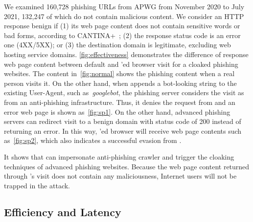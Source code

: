 We examined 160,728 phishing URLs from APWG from November 2020 to July 2021,
132,247 of which do not contain malicious content.
We consider an HTTP response benign if (1) its web page content does not contain sensitive words or bad forms, according to CANTINA+~\cite{xiang2011cantina+};
(2) the response status code is an error one (4XX/5XX);
or (3) the destination domain is legitimate, excluding web hosting service domains.
\autoref{fig:effectiveness} demonstrates the difference of response web page content between default and \spartacus'ed browser visit for a cloaked phishing websites.
The content in~\autoref{fig:normal} shows the phishing content when a real person visits it.
On the other hand, when \spartacus appends a bot-looking string to the existing User-Agent, such as~\emph{googlebot}, the phishing server considers the visit as from an anti-phishing infrastructure.
Thus, it denies the request from \spartacus and an error web page is shown as~\autoref{fig:sp1}.
On the other hand, advanced phishing servers can redirect visit to a benign domain with status code of 200 instead of returning an error.
In this way, \spartacus'ed browser will receive web page contents such as~\autoref{fig:sp2},
which also indicates a successful evasion 
from \spartacus.

It shows that \spartacus can impersonate anti-phishing crawler and trigger the cloaking techniques of advanced phishing websites.
Because the web page content returned through \spartacus's visit does not contain any maliciousness, Internet users will not be trapped in the attack.





\subsection{Efficiency and Latency}

